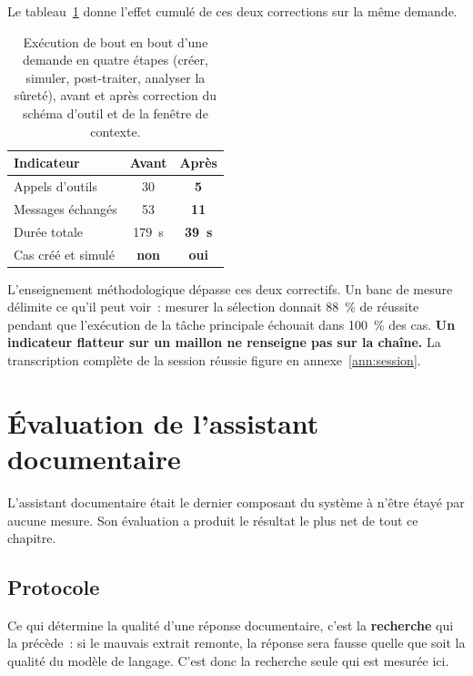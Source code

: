 \documentclass[12pt,a4paper,french]{report}
\begin{document}
Le tableau~\ref{tab:bout-en-bout} donne l'effet cumulé de ces deux corrections
sur la même demande.

\begin{table}[htbp]
\centering
\caption[Exécution de bout en bout]{Exécution de bout en bout d'une demande en quatre étapes (créer,
simuler, post-traiter, analyser la sûreté), avant et après correction du schéma
d'outil et de la fenêtre de contexte.}
\label{tab:bout-en-bout}
\begin{tabularx}{0.92\textwidth}{@{}Xcc@{}}
\toprule
\textbf{Indicateur} & \textbf{Avant} & \textbf{Après}\\
\midrule
Appels d'outils & \num{30} & \textbf{\num{5}}\\
Messages échangés & \num{53} & \textbf{\num{11}}\\
Durée totale & \SI{179}{\second} & \textbf{\SI{39}{\second}}\\
Cas créé et simulé & \textcolor{cAlert}{\textbf{non}} & \textbf{oui}\\
\bottomrule
\end{tabularx}
\end{table}

L'enseignement méthodologique dépasse ces deux correctifs. Un banc de mesure
délimite ce qu'il peut voir~: mesurer la sélection donnait \SI{88}{\percent} de
réussite pendant que l'exécution de la tâche principale échouait dans
\SI{100}{\percent} des cas. \textbf{Un indicateur flatteur sur un maillon ne
renseigne pas sur la chaîne.} La transcription complète de la session
réussie figure en annexe~\ref{ann:session}.

\section{Évaluation de l'assistant documentaire}
\label{sec:rag}

L'assistant documentaire était le dernier composant du système à n'être étayé
par aucune mesure. Son évaluation a produit le résultat le plus net de tout ce
chapitre.

\subsection{Protocole}

Ce qui détermine la qualité d'une réponse documentaire, c'est la
\textbf{recherche} qui la précède~: si le mauvais extrait remonte, la réponse
sera fausse quelle que soit la qualité du modèle de langage. C'est donc la
recherche seule qui est mesurée ici.
\end{document}

